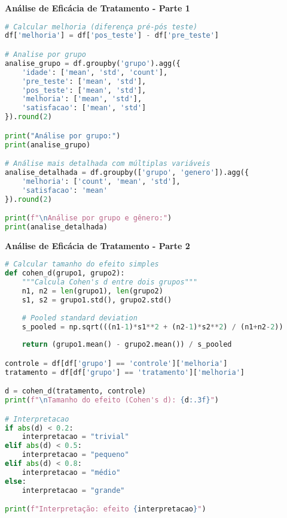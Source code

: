 \begin{researchbox}
\textbf{Análise de Eficácia de Tratamento - Parte 1}

\begin{lstlisting}[language=Python]
# Calcular melhoria (diferença pré-pós teste)
df['melhoria'] = df['pos_teste'] - df['pre_teste']

# Analise por grupo
analise_grupo = df.groupby('grupo').agg({
    'idade': ['mean', 'std', 'count'],
    'pre_teste': ['mean', 'std'],
    'pos_teste': ['mean', 'std'],
    'melhoria': ['mean', 'std'],
    'satisfacao': ['mean', 'std']
}).round(2)

print("Análise por grupo:")
print(analise_grupo)

# Análise mais detalhada com múltiplas variáveis
analise_detalhada = df.groupby(['grupo', 'genero']).agg({
    'melhoria': ['count', 'mean', 'std'],
    'satisfacao': 'mean'
}).round(2)

print(f"\nAnálise por grupo e gênero:")
print(analise_detalhada)
\end{lstlisting}
\end{researchbox}

\begin{researchbox}
\textbf{Análise de Eficácia de Tratamento - Parte 2}

\begin{lstlisting}[language=Python]
# Calcular tamanho do efeito simples
def cohen_d(grupo1, grupo2):
    """Calcula Cohen's d entre dois grupos"""
    n1, n2 = len(grupo1), len(grupo2)
    s1, s2 = grupo1.std(), grupo2.std()
    
    # Pooled standard deviation
    s_pooled = np.sqrt(((n1-1)*s1**2 + (n2-1)*s2**2) / (n1+n2-2))
    
    return (grupo1.mean() - grupo2.mean()) / s_pooled

controle = df[df['grupo'] == 'controle']['melhoria']
tratamento = df[df['grupo'] == 'tratamento']['melhoria']

d = cohen_d(tratamento, controle)
print(f"\nTamanho do efeito (Cohen's d): {d:.3f}")

# Interpretacao
if abs(d) < 0.2:
    interpretacao = "trivial"
elif abs(d) < 0.5:
    interpretacao = "pequeno"
elif abs(d) < 0.8:
    interpretacao = "médio"
else:
    interpretacao = "grande"

print(f"Interpretação: efeito {interpretacao}")
\end{lstlisting}
\end{researchbox}

